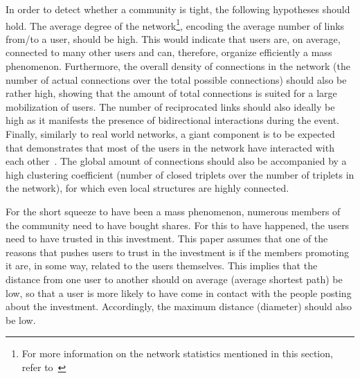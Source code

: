 \documentclass[noacm,sigconf,authorversion]{acmart}
\begin{document}
In order to detect whether a community is tight, the following hypotheses should hold. The average degree of the network\footnote{For more information on the network statistics mentioned in this section, refer to~\cite{knoke2019social}}, encoding the average number of links from/to a user, should be high. This would indicate that users are, on average, connected to many other users and can, therefore, organize efficiently a mass phenomenon. Furthermore, the overall density of connections in the network (the number of actual connections over the total possible connections) should also be rather high, showing that the amount of total connections is suited for a large mobilization of users. The number of reciprocated links should also ideally be high as it manifests the presence of bidirectional interactions during the event. Finally, similarly to real world networks, a giant component is to be expected that demonstrates that most of the users in the network have interacted with each other~\cite{knoke2019social}. The global amount of connections should also be accompanied by a high clustering coefficient (number of closed triplets over the number of triplets in the network), for which even local structures are highly connected.

For the short squeeze to have been a mass phenomenon, numerous members of the community need to have bought shares. For this to have happened, the users need to have trusted in this investment. This paper assumes that one of the reasons that pushes users to trust in the investment is if the members promoting it are, in some way, related to the users themselves. This implies that the distance from one user to another should on average (average shortest path) be low, so that a user is more likely to have come in contact with the people posting about the investment. Accordingly, the maximum distance (diameter) should also be low.
\end{document}
